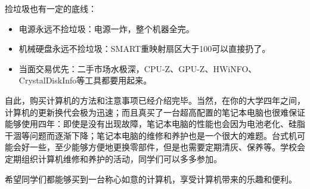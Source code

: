 \documentclass[../main.tex]{subfiles}
\begin{document}
捡垃圾也有一定的底线：
\begin{itemize}
  \item 电源永远不捡垃圾：电源一炸，整个机器全完。
  \item 机械硬盘永远不捡垃圾：SMART重映射扇区大于100可以直接扔了。
  \item 当面交易优先：二手市场水极深，CPU-Z、GPU-Z、HWiNFO、CrystalDiskInfo等工具都要用起来。
\end{itemize}

自此，购买计算机的方法和注意事项已经介绍完毕。当然，在你的大学四年之间，计算机的更新换代会极为迅速；而且真买了一台超高配置的笔记本电脑也很难保证能够使用四年：即使是没有出现故障，笔记本电脑的性能也会因为电池老化、硅脂干涸等问题而逐渐下降；笔记本电脑的维修和养护也是一个很大的难题。台式机可能会好一些，至少能够方便地更换零部件，但是也需要定期清灰、保养等。学校会定期组织计算机维修和养护的活动，同学们可以多多参加。

希望同学们都能够买到一台称心如意的计算机，享受计算机带来的乐趣和便利。
\end{document}
